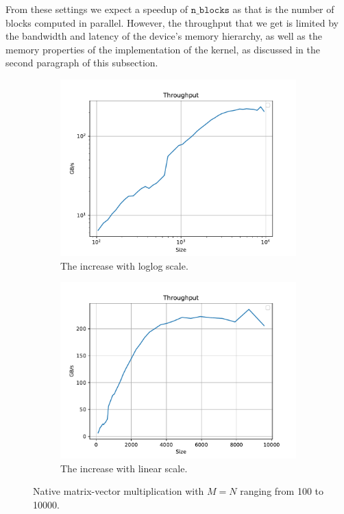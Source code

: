 \documentclass[9pt]{article}
\begin{document}
From these settings we expect a speedup of $\texttt{n\_blocks}$ as that is the number of blocks computed in parallel. However, the throughput that we get is limited by the bandwidth and latency of the device's memory hierarchy, as well as the memory properties of the implementation of the kernel, as discussed in the second paragraph of this subsection.
\begin{figure}[!ht]
    \centering
    \begin{subfigure}[b]{0.49\textwidth}
        \centering
        \includegraphics[width=\linewidth]{figs/loglog.pdf}
        \caption{The increase with loglog scale.}
        \label{fig:native_loglog}
    \end{subfigure}\hfill
    \begin{subfigure}[b]{0.49\textwidth}
        \centering
        \includegraphics[width=\linewidth]{figs/linear.pdf}
	\caption{The increase with linear scale.}
	\label{fig:native_linear}
    \end{subfigure}\hfill
    \caption{Native matrix-vector multiplication with $M=N$ ranging from 100 to 10000.}
    \label{fig:mv_native_mult}
\end{figure}
\end{document}
